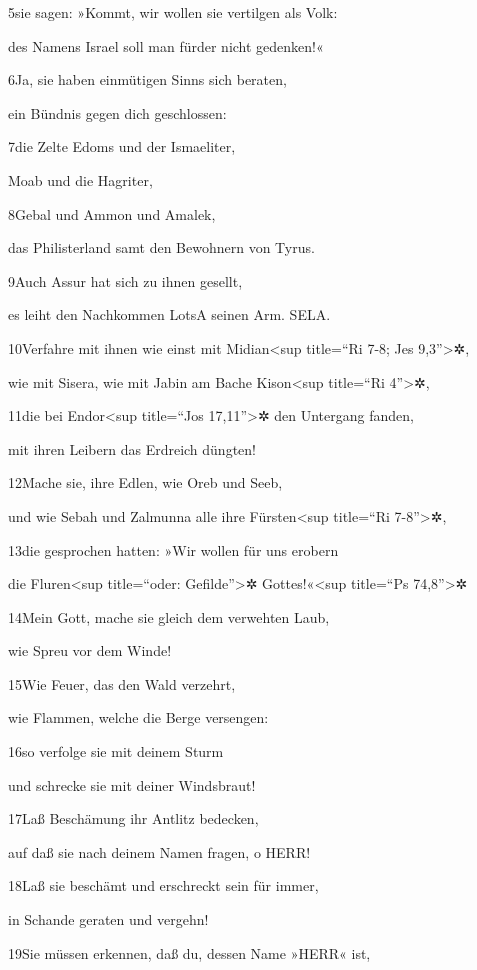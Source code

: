 5sie sagen: »Kommt, wir wollen sie vertilgen als Volk:

des Namens Israel soll man fürder nicht gedenken!«

6Ja, sie haben einmütigen Sinns sich beraten,

ein Bündnis gegen dich geschlossen:

7die Zelte Edoms und der Ismaeliter,

Moab und die Hagriter,

8Gebal und Ammon und Amalek,

das Philisterland samt den Bewohnern von Tyrus.

9Auch Assur hat sich zu ihnen gesellt,

es leiht den Nachkommen Lots{A} seinen Arm. SELA.

10Verfahre mit ihnen wie einst mit Midian\textless sup title=``Ri 7-8;
Jes 9,3''\textgreater✲,

wie mit Sisera, wie mit Jabin am Bache Kison\textless sup title=``Ri
4''\textgreater✲,

11die bei Endor\textless sup title=``Jos 17,11''\textgreater✲ den
Untergang fanden,

mit ihren Leibern das Erdreich düngten!

12Mache sie, ihre Edlen, wie Oreb und Seeb,

und wie Sebah und Zalmunna alle ihre Fürsten\textless sup title=``Ri
7-8''\textgreater✲,

13die gesprochen hatten: »Wir wollen für uns erobern

die Fluren\textless sup title=``oder: Gefilde''\textgreater✲
Gottes!«\textless sup title=``Ps 74,8''\textgreater✲

14Mein Gott, mache sie gleich dem verwehten Laub,

wie Spreu vor dem Winde!

15Wie Feuer, das den Wald verzehrt,

wie Flammen, welche die Berge versengen:

16so verfolge sie mit deinem Sturm

und schrecke sie mit deiner Windsbraut!

17Laß Beschämung ihr Antlitz bedecken,

auf daß sie nach deinem Namen fragen, o HERR!

18Laß sie beschämt und erschreckt sein für immer,

in Schande geraten und vergehn!

19Sie müssen erkennen, daß du, dessen Name »HERR« ist,


